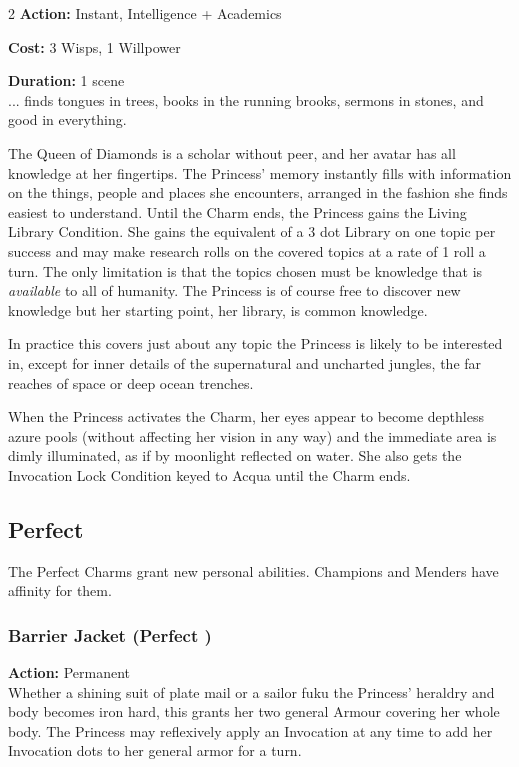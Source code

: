 \begin{multicols}{2}
\noindent \textbf{Action:} Instant, Intelligence + Academics

\noindent \textbf{Cost:} 3 Wisps, 1 Willpower

\noindent \textbf{Duration:} 1 scene \\

\noindent ... finds tongues in trees, books in the running brooks, sermons in stones, and good in everything.

The Queen of Diamonds is a scholar without peer, and her avatar has all knowledge at her fingertips. The Princess' memory instantly fills with information on the things, people and places she encounters, arranged in the fashion she finds easiest to understand. Until the Charm ends, the Princess gains the Living Library Condition. She gains the equivalent of a 3 dot Library on one topic per success and may make research rolls on the covered topics at a rate of 1 roll a turn. The only limitation is that the topics chosen must be knowledge that is \textit{available} to all of humanity. The Princess is of course free to discover new knowledge but her starting point, her library, is common knowledge. 

In practice this covers just about any topic the Princess is likely to be interested in, except for inner details of the supernatural and uncharted jungles, the far reaches of space or deep ocean trenches. 

When the Princess activates the Charm, her eyes appear to become depthless azure pools (without affecting her vision in any way) and the immediate area is dimly illuminated, as if by moonlight reflected on water. She also gets the Invocation Lock Condition keyed to Acqua until the Charm ends.

\subsection*{Perfect}
\label{subsec:Perfect}
The Perfect Charms grant new personal abilities. Champions and Menders have affinity for them.

\subsubsection*{Barrier Jacket (Perfect \textbullet)}

\noindent \textbf{Action:} Permanent \\

\noindent  Whether a shining suit of plate mail or a sailor fuku the Princess' heraldry and body becomes iron hard, this grants her two general Armour covering her whole body. The Princess may reflexively apply an Invocation at any time to add her Invocation dots to her general armor for a turn. 


\end{multicols}
